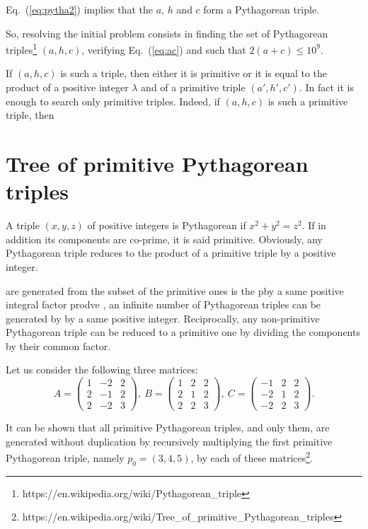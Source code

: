 \documentclass[11pt, a4paper]{article}
\newcommand{\Eq}[1]{Eq.~(\ref{#1})}
\begin{document}
\Eq{eq:pytha2} implies that the $a$, $h$ and $c$ form a Pythagorean triple.


So, resolving the initial problem consists in finding the set of Pythagorean triples\footnote{https://en.wikipedia.org/wiki/Pythagorean\_triple} $(a, h, c)$, verifying \Eq{eq:ac} and such that $2(a+c)\le10^9$.


If $(a, h, c)$ is such a triple, then either it is primitive or it is equal to the product of a positive integer $\lambda$ and of a primitive triple $(a', h', c')$. 
In fact it is enough to search only primitive triples. Indeed, if $(a, h, c)$ is such a primitive triple, then 


\section{Tree of primitive Pythagorean triples}
A triple $(x, y, z)$ of positive integers is Pythagorean if $x^2+y^2=z^2$. If in addition its components are co-prime, it is said primitive. Obviously, any Pythagorean triple reduces to the product of a primitive triple by a positive integer. 

 are generated from the subset of the primitive ones  is the pby a same positive integral factor prodve , an infinite number of Pythagorean triples can be generated by  by a same positive integer. Reciprocally, any non-primitive Pythagorean triple can be reduced to a primitive one by dividing the components by their common factor.

Let us consider the following three matrices:
\[
A = \left(\begin{matrix}  1 & -2 & 2 \\  2 & -1 & 2 \\  2 & -2 & 3 \end{matrix} \right)\!,\ 
B = \left(\begin{matrix}  1 &  2 & 2 \\  2 &  1 & 2 \\  2 &  2 & 3 \end{matrix} \right)\!,\
C = \left(\begin{matrix} -1 &  2 & 2 \\ -2 &  1 & 2 \\ -2 &  2 & 3 \end{matrix} \right)\!.
\]

It can be shown that all primitive Pythagorean triples, and only them, are generated without duplication by recursively multiplying the first primitive Pythagorean triple, namely $p_0=(3, 4, 5)$, by each of these matrices\footnote{https://en.wikipedia.org/wiki/Tree\_of\_primitive\_Pythagorean\_triples}.
\end{document}
